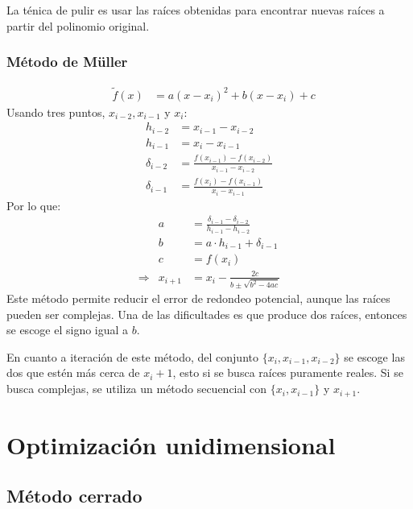 \documentclass[letterpaper, 12pt, twoside]{article}
\begin{document}
	La ténica de pulir es usar las raíces obtenidas para encontrar nuevas raíces a partir del polinomio original.
	\subsubsection{Método de Müller}
	\begin{eqnarray*}
		&\tilde{f}(x) &= a(x-x_i)^2 +b(x-x_i) +c		
	\end{eqnarray*}
		Usando tres puntos, $x_{i-2}, x_{i-1}$ y $x_i$:
	\begin{eqnarray*}
		h_{i-2} &= x_{i-1}-x_{i-2}\\
		h_{i-1} &= x_{i}-x_{i-1}\\
		\delta_{i-2} &= \frac{f(x_{i-1})-f(x_{i-2})}{x_{i-1}-x_{i-2}}\\
		\delta_{i-1} &= \frac{f(x_{i})-f(x_{i-1})}{x_{i}-x_{i-1}}
	\end{eqnarray*}
	Por lo que:
	\begin{eqnarray*}
		&a &= \frac{\delta_{i-1}-\delta_{i-2}}{h_{i-1}-h_{i-2}}\\
		&b &= a\cdot h_{i-1} + \delta_{i-1}\\
		&c &= f(x_i)\\
		\Rightarrow &x_{i+1} &= x_i - \frac{2c}{b\pm\sqrt{b^2-4ac}}
	\end{eqnarray*}
	Este método permite reducir el error de redondeo potencial, aunque las raíces pueden ser complejas. Una de las dificultades es que produce dos raíces, entonces se escoge el signo igual a $b$.
	\bigskip
	
	En cuanto a iteración de este método, del conjunto $\{x_i,x_{i-1}, x_{i-2}\}$ se escoge las dos que estén más cerca de $x_i+1$, esto si se busca raíces puramente reales. Si se busca complejas, se utiliza un método secuencial con $\{x_i,x_{i-1}\}$ y $x_{i+1}$.
	\section{Optimización unidimensional}
	\subsection{Método cerrado}
\end{document}
